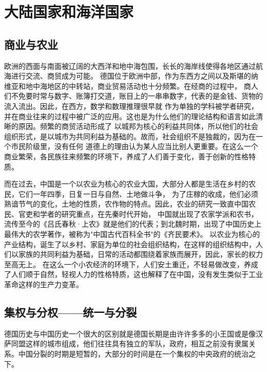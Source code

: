 \section{大陆国家和海洋国家}


\subsection{商业与农业}

欧洲的西面与南面被辽阔的大西洋和地中海包围，长长的海岸线使得各地区通过航海进行交流、商贸成为可能。
德国位于欧洲中部，作为东西方之间以及斯堪的纳维亚和地中海地区的中转站，商业贸易活动也十分频繁。在经商的过程中，
商人们不免要时常与数字、账簿打交道，账目上的一串串数字，代表的是金钱、货物的流入流出。因此，在西方，数学和数理推理很早就
作为单独的学科被学者研究，并在商业往来的过程中被广泛的应用。这也是为什么他们的理论结构和语言如此清晰的原因。频繁的商贸活动形成了
以城邦为核心的利益共同体，所以他们的社会组织形式，是以城市为共同利益为基础的。故而，社会组织不是独裁的，因为在一个市民阶级里，没有任何
道德上的理由认为某人应当比别人更重要。在这么一个商业繁荣，各民族往来频繁的环境下，养成了人们善于变化，善于创新的性格特质。

而在过去，中国是一个以农业为核心的农业大国，大部分人都是生活在乡村的农民，它们一年四季，日复一日与自然、土地做斗争，
为了庄稼的收成，他们必须熟谙节气的变化，土地的性质，农作物的特点。因此，农业的研究一致直中国农民、官吏和学者的研究重点，在先秦时代开始，
中国就出现了农家学派和农书，流传至今的《吕氏春秋·上农》就是他们的代表；到北魏时期，出现了中国历史上最伟大的农学著作，被称为"中国古代百科全书"的《齐民要术》。
以农业为核心的产业结构，诞生了以乡村、家庭为单位的社会组织结构，在这样的组织结构中，人们以家族的共同利益为基础，日常的活动都围绕着家族而展开，因此，家长的权力至高无上。
在这么一个小农经济的环境下，人们安土重迁，不轻易做改变，养成了人们顺于自然，轻视人力的性格特质，这也解释了在中国，没有发生类似于工业革命这样的生产力变革。




\subsection{集权与分权——统一与分裂}

德国历史与中国历史一个很大的区别就是德国长期是由许许多多的小王国或是像汉萨同盟这样的城市组成，他们往往具有独立的军队，政府，相互之前没有隶属关系。中国分裂的时期是短暂的，大部分的时间是在一个集权的中央政府的统治之下。
